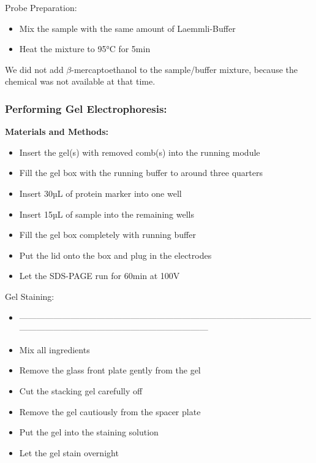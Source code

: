 Probe Preparation:
\begin{itemize}
    \item Mix the sample with the same amount of Laemmli-Buffer
    \item Heat the mixture to 95°C for 5min
\end{itemize}

We did not add \(\beta\)-mercaptoethanol to the sample/buffer mixture, because the chemical was not available at that time.

\subsubsection{Performing Gel Electrophoresis:}
\textbf{Materials and Methods:}
\begin{itemize}
    \item Insert the gel(s) with removed comb(s) into the running module
    \item Fill the gel box with the running buffer to around three quarters
    \item Insert 30µL of protein marker into one well
    \item Insert 15µL of sample into the remaining wells
    \item Fill the gel box completely with running buffer
    \item Put the lid onto the box and plug in the electrodes
    \item Let the SDS-PAGE run for 60min at 100V
\end{itemize}

Gel Staining:
\begin{itemize}
    \item ------------------------------------------------------------------------------------------------------------------------------------------------------------------------
    \item Mix all ingredients
    \item Remove the glass front plate gently from the gel
    \item Cut the stacking gel carefully off
    \item Remove the gel cautiously from the spacer plate
    \item Put the gel into the staining solution
    \item Let the gel stain overnight
\end{itemize}

